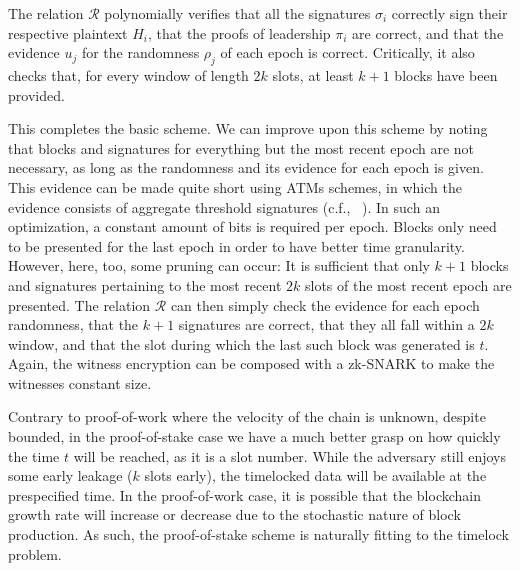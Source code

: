 The relation $\mathcal{R}$ polynomially verifies that all the signatures $\sigma_i$
correctly sign their respective plaintext $H_i$, that
the proofs of leadership $\pi_i$ are correct, and that the evidence $u_j$ for the
randomness $\rho_j$ of each epoch is correct.
Critically, it also checks that, for every window of length $2k$ slots, at least
$k+1$ blocks have been provided.

This completes the basic scheme. We can improve upon this scheme by noting
that blocks and signatures for everything but the most recent epoch
are not necessary, as long as the randomness and its evidence for each epoch is
given. This evidence can be made quite short using ATMs schemes, in which the
evidence consists of aggregate threshold signatures
(c.f., ~\cite{pos-sidechains}). In such an optimization, a constant amount of bits
is required per epoch. Blocks only need to be presented for the last
epoch in order to have better time granularity. However, here, too, some pruning can
occur: It is sufficient that only $k+1$
blocks and signatures pertaining to the most recent $2k$ slots of the most recent epoch
are presented.
The relation $\mathcal{R}$ can then simply check the evidence for each epoch randomness,
that the $k+1$ signatures are correct, that they all fall within a $2k$ window, and
that the slot during which the last such block was generated is $t$.
Again, the witness encryption can be composed with a zk-SNARK
to make the witnesses constant size.

Contrary to proof-of-work where the velocity of the chain is unknown, despite bounded,
in the proof-of-stake case we have a much better grasp on how quickly the time $t$
will be reached, as it is a slot number. While the adversary still enjoys some early
leakage ($k$ slots early), the timelocked data will be available at the prespecified time.
In the proof-of-work case, it is possible that the blockchain growth rate will
increase or decrease due to the stochastic nature of block production. As such, the
proof-of-stake scheme is naturally fitting to the timelock problem.
